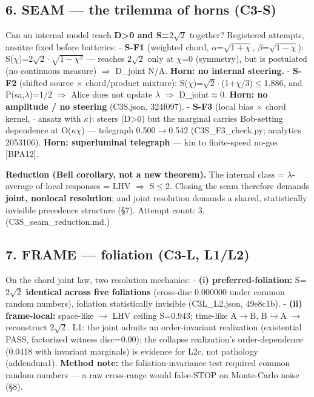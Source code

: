\documentclass[
  11pt]{article}
\begin{document}
\subsection{6. SEAM --- the trilemma of horns
(C3-S)}\label{seam-the-trilemma-of-horns-c3-s}

Can an internal model reach \textbf{D\textgreater0 and S=$2\sqrt{2}$} together?
Registered attempts, ans\"atze fixed before batteries: - \textbf{S-F1}
(weighted chord, $\alpha$=$\sqrt{1+\chi}$, $\beta$=$\sqrt{1-\chi}$): S($\chi$)=$2\sqrt{2}\cdot\sqrt{1-\chi^{2}}$ --- reaches $2\sqrt{2}$
only at $\chi$=0 (symmetry), but is postulated (no continuous measure) $\Rightarrow$
D\_joint N/A. \textbf{Horn: no internal steering.} - \textbf{S-F2}
(shifted source $\times$ chord/product mixture): S($\chi$)=$\sqrt{2}\cdot$(1+$\chi$/3)$\le$1.886, and
P(s\textbar a,$\lambda$)=$1/2$ $\Rightarrow$ Alice does not update $\lambda$ $\Rightarrow$ D\_joint$\approx$0. \textbf{Horn:
no amplitude / no steering} (C3S.json, 324f097). - \textbf{S-F3} (local
bias $\times$ chord kernel, \textbar$\cdot$\textbar{} ansatz with $\kappa$): steers
(D\textgreater0) but the marginal carries Bob-setting dependence at
O($\kappa\chi$) --- telegraph 0.500$\to$0.542 (C3S\_F3\_check.py; analytics 2053106).
\textbf{Horn: superluminal telegraph} --- kin to finite-speed no-gos
{[}BPA12{]}.

\textbf{Reduction (Bell corollary, not a new theorem).} The internal
class = $\lambda$-average of local responses = LHV $\Rightarrow$ S$\le$2. Closing the seam
therefore demands \textbf{joint, nonlocal resolution}; and joint
resolution demands a shared, statistically invisible precedence
structure (\S7). Attempt count: 3. (C3S\_seam\_reduction.md.)

\subsection{7. FRAME --- foliation (C3-L,
L1/L2)}\label{frame-foliation-c3-l-l1l2}

On the chord joint law, two resolution mechanics: - \textbf{(i)
preferred-foliation:} S=$2\sqrt{2}$ \textbf{identical across five foliations}
(cross-disc 0.000000 under common random numbers), foliation
statistically invisible (C3L\_L2.json, 49e8c1b). - \textbf{(ii)
frame-local:} space-like $\to$ LHV ceiling S=0.943; time-like A$\to$B, B$\to$A $\to$
reconstruct $2\sqrt{2}$. L1: the joint admits an order-invariant realization
(existential PASS, factorized witness disc=0.00); the collapse
realization's order-dependence (0.0418 with invariant marginals) is
evidence for L2c, not pathology (addendum1). \textbf{Method note:} the
foliation-invariance test required common random numbers --- a raw
cross-range would false-STOP on Monte-Carlo noise (\S8).
\end{document}
